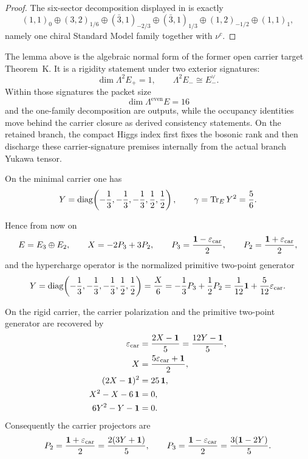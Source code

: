 \begin{proof}
The six-sector decomposition displayed in  is exactly
\[
(1,1)_0\oplus(3,2)_{1/6}\oplus(\bar 3,1)_{-2/3}\oplus(\bar 3,1)_{1/3}\oplus(1,2)_{-1/2}\oplus(1,1)_1,
\]
namely one chiral Standard Model family together with $\nu^c$.
\end{proof}

\begin{remark}
The lemma above is the algebraic normal form of the former open carrier target Theorem~K. It is a rigidity
statement under two exterior signatures:
\[
\dim \Lambda^2 E_+=1,
\qquad
\Lambda^2 E_- \cong E_-^\vee.
\]
Within those signatures the packet size
\[
\dim\Lambda^{\mathrm{even}}E=16
\]
and the one-family decomposition are outputs, while the occupancy identities move behind the
carrier closure as derived consistency statements. On the retained branch, the compact Higgs index
first fixes the bosonic rank and  then
discharge these carrier-signature premises internally from the actual branch Yukawa tensor.
\end{remark}

\begin{corollary}
On the minimal carrier one has
\[
Y
=
\mathrm{diag}\!\left(-\frac13,-\frac13,-\frac13,\frac12,\frac12\right),
\qquad
\gamma=\operatorname{Tr}_EY^2=\frac56.
\]
\end{corollary}

Hence from now on
\[
E=E_3\oplus E_2,
\qquad
X=-2P_3+3P_2,
\qquad
P_3=\frac{\mathbf 1-\varepsilon_{\mathrm{car}}}{2},
\qquad
P_2=\frac{\mathbf 1+\varepsilon_{\mathrm{car}}}{2},
\]
and the hypercharge operator is the normalized primitive two-point generator
\begin{equation}
\label{eq:explicit-hypercharge}
Y
=
\mathrm{diag}\!\left(-\frac13,-\frac13,-\frac13,\frac12,\frac12\right)
=
\frac{X}{6}
=
-\frac13 P_3+\frac12 P_2
=
\frac1{12}\mathbf 1+\frac5{12}\varepsilon_{\mathrm{car}}.
\end{equation}

\begin{lemma}
On the rigid carrier, the carrier polarization and the primitive two-point generator are recovered by
\begin{align}
\varepsilon_{\mathrm{car}}&=\frac{2X-\mathbf 1}{5}=\frac{12Y-\mathbf 1}{5},
\label{eq:hypercharge-seam-inversion}\\
\qquad
X&=\frac{5\varepsilon_{\mathrm{car}}+\mathbf 1}{2},
\nonumber\\
(2X-\mathbf 1)^2&=25\,\mathbf 1,
\nonumber\\
X^2-X-6\,\mathbf 1&=0,
\nonumber\\
6Y^2-Y-\mathbf 1&=0.
\label{eq:carrier-polynomial}
\end{align}
Consequently the carrier projectors are
\[
P_2=\frac{\mathbf 1+\varepsilon_{\mathrm{car}}}{2}=\frac{2(3Y+\mathbf 1)}{5},
\qquad
P_3=\frac{\mathbf 1-\varepsilon_{\mathrm{car}}}{2}=\frac{3(\mathbf 1-2Y)}{5}.
\]
\end{lemma}


